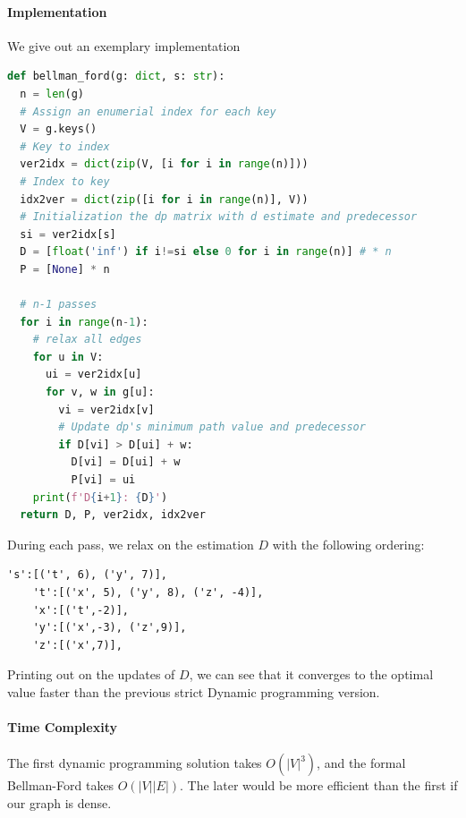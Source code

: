 \documentclass[../main.tex]{subfiles}
\begin{document}
\paragraph{Implementation} We give out an exemplary implementation
\begin{lstlisting}[language=Python]
def bellman_ford(g: dict, s: str):
  n = len(g)
  # Assign an enumerial index for each key
  V = g.keys()
  # Key to index
  ver2idx = dict(zip(V, [i for i in range(n)]))
  # Index to key
  idx2ver = dict(zip([i for i in range(n)], V))
  # Initialization the dp matrix with d estimate and predecessor
  si = ver2idx[s]
  D = [float('inf') if i!=si else 0 for i in range(n)] # * n
  P = [None] * n
  
  # n-1 passes
  for i in range(n-1): 
    # relax all edges
    for u in V:
      ui = ver2idx[u]
      for v, w in g[u]:
        vi = ver2idx[v]
        # Update dp's minimum path value and predecessor
        if D[vi] > D[ui] + w:
          D[vi] = D[ui] + w
          P[vi] = ui
    print(f'D{i+1}: {D}')  
  return D, P, ver2idx, idx2ver
\end{lstlisting}
During each pass, we relax on the estimation $D$ with the following ordering:
\begin{lstlisting}[numbers=none]
    's':[('t', 6), ('y', 7)],   
    't':[('x', 5), ('y', 8), ('z', -4)],
    'x':[('t',-2)],
    'y':[('x',-3), ('z',9)],
    'z':[('x',7)],
\end{lstlisting}
Printing out on the updates of $D$, we can see that it converges to the optimal value faster than the previous strict Dynamic programming version. 

\paragraph{Time Complexity} The first dynamic programming solution takes $O(|V|^3)$, and the formal Bellman-Ford takes $O(|V||E|)$. The later would be more efficient than the first if our graph is dense.
\end{document}
